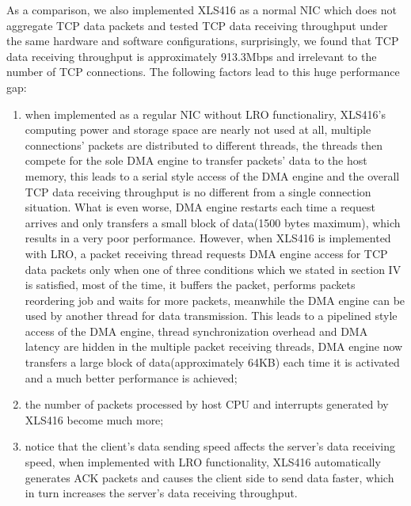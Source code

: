 \documentclass[conference]{IEEEtran}
\begin{document}
As a comparison, we also implemented XLS416 as a normal NIC which does not aggregate TCP data packets and tested TCP data receiving throughput under the same hardware and software configurations, surprisingly, we found that TCP data receiving throughput is approximately 913.3Mbps and irrelevant to the number of TCP connections. The following factors lead to this huge performance gap:
\begin{enumerate}
\item when implemented as a regular NIC without LRO functionaliry, XLS416's computing power and storage space are nearly not used at all, multiple connections' packets are distributed to different threads, the threads then compete for the sole DMA engine to transfer packets' data to the host memory, this leads to a serial style access of the DMA engine and the overall TCP data receiving throughput is no different from a single connection situation. What is even worse, DMA engine restarts each time a request arrives and only transfers a small block of data(1500 bytes maximum), which results in a very poor performance. However, when XLS416 is implemented with LRO, a packet receiving thread requests DMA engine access for TCP data packets only when one of three conditions which we stated in section IV is satisfied, most of the time, it buffers the packet, performs packets reordering job and waits for more packets, meanwhile the DMA engine can be used by another thread for data transmission. This leads to a pipelined style access of the DMA engine, thread synchronization overhead and DMA latency are hidden in the multiple packet receiving threads, DMA engine now transfers a large block of data(approximately 64KB) each time it is activated and a much better performance is achieved;
\item the number of packets processed by host CPU and interrupts generated by XLS416 become much more;
\item notice that the client's data sending speed affects the server's data receiving speed, when implemented with LRO functionality, XLS416 automatically generates ACK packets and causes the client side to send data faster, which in turn increases the server's data receiving throughput.
\end{enumerate}
\end{document}
